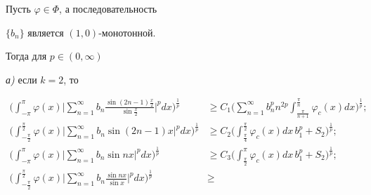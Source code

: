 




\begin{lem}


Пусть $\varphi \in\Phi$, а последовательность


$\{b_n\}$ является $(1,0)$-монотонной.


Тогда для $p\in(0,\infty)$





{\em а)} если $k=2$, то


\begin{align}


\bigg( \int_{-\pi}^{\pi}\varphi(x)\bigg|\sum\limits_{n=1}^{\infty} b_n


\frac{\sin(2n-1)\frac{x}{2}}{\sin\frac{x}{2}}


\bigg|^p dx \bigg)^{\frac{1}{p}} 


&\geq C_1\bigg( \sum\limits_{n=1}^{\infty} b_n^p n^{2p} 


\int_{\frac{\pi}{n+1}}^{\frac{\pi}{n}}


\varphi_c(x) dx\bigg)^{\frac{1}{p}}; \\


%


\bigg( \int_{-\frac{\pi}{2}}^{\frac{\pi}{2}} 


\varphi(x)\bigg|\sum\limits_{n=1}^{\infty} b_n 


\sin(2n-1)x \bigg|^p dx \bigg)^{\frac{1}{p}} 


&\geq C_2\bigg( \int_{\frac{\pi}{4}}^{\frac{\pi}{2}}


\varphi_c (x)dx\, b_1^p+S_2\bigg)^


{\frac{1}{p}}; \\


%


\bigg( \int_{-\pi}^{\pi}\varphi(x)\bigg|\sum\limits_{n=1}^{\infty} b_n


\sin nx \bigg|^p dx \bigg)^{\frac{1}{p}} &\geq


C_3\bigg( \int_{\frac{\pi}{2}}^{\pi} 


\varphi_c(x) dx\, b_1^p+S_2\bigg)^


{\frac{1}{p}};\\


%


\bigg( \int_{-\frac{\pi}{2}}^{\frac{\pi}{2}}


\varphi(x)\bigg|\sum\limits_{n=1}^{\infty} b_n


\frac{\sin nx}{\sin x} \bigg|^p dx \bigg)^{\frac{1}{p}} &\geq



\end{align}
\end{lem}
